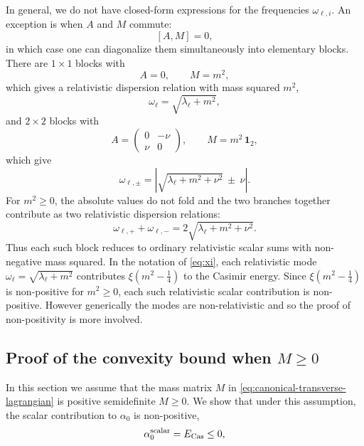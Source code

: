 \documentclass[a4paper,11pt]{article}
\begin{document}
In general, we do not have closed-form expressions for the frequencies $\omega_{\ell,i}$. An exception is when $A$ and $M$ commute:
\begin{equation}\label{eq:A_M_commute}
  [A,M]=0,
\end{equation}
in which case one can diagonalize them simultaneously into elementary blocks. There are $1\times1$ blocks with
\begin{equation}
  A=0,\qquad M=m^2,
\end{equation}
which gives a relativistic dispersion relation with mass squared $m^2$,
\begin{equation}\label{eq:spectrum1-new}
  \omega_\ell=\sqrt{\lambda_\ell+m^2},
\end{equation}
and $2\times2$ blocks with
\begin{equation}
    A=
    \begin{pmatrix}
    0&-\nu\\
    \nu&0
    \end{pmatrix},
    \qquad
    M=m^2\,\mathbf 1_2,
\end{equation}
which give
\begin{equation}\label{eq:spectrum2-new}
  \omega_{\ell,\pm} = \left|\sqrt{\lambda_\ell+m^2+\nu^2}\ \pm\ \nu\right|.
\end{equation}
For $m^2\geq0$, the absolute values do not fold and the two branches together contribute as two relativistic dispersion relations: 
\begin{equation}
  \omega_{\ell,+}+\omega_{\ell,-} = 2\sqrt{\lambda_\ell+m^2+\nu^2}.
\end{equation}
Thus each such block reduces to ordinary relativistic scalar sums with non-negative mass squared. In the notation of \eqref{eq:xi}, each relativistic mode $\omega_\ell=\sqrt{\lambda_\ell+m^2}$ contributes $\xi(m^2-\frac14)$ to the Casimir energy. Since $\xi(m^2-\frac14)$ is non-positive for $m^2\geq0$, each such relativistic scalar contribution is non-positive. However generically the modes are non-relativistic and so the proof of non-positivity is more involved.


\subsection{Proof of the convexity bound when $M\geq 0$}\label{subsec:projected-convexity-proof}



In this section we assume that the mass matrix $M$ in \eqref{eq:canonical-transverse-lagrangian} is positive semidefinite $M\geq 0$. We show that under this assumption, the scalar contribution to $\alpha_0$ is non-positive,
\begin{equation}
  \alpha_{0}^{\rm scalar} = E_{\rm Cas} \leq 0 ,
\end{equation}
\end{document}
